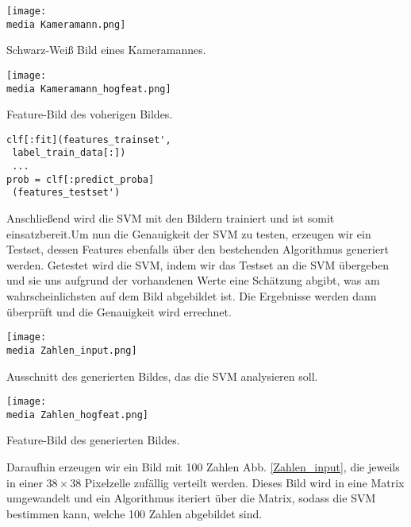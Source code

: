 \begin{dsafigure}
\begin{center}
	\texttt{[image: \\media Kameramann.png]}
	\caption{Schwarz-Weiß Bild eines Kameramannes.}
	\label{Kameramann}
\end{center}
\end{dsafigure}

\begin{dsafigure}
\begin{center}
	\texttt{[image: \\media Kameramann\_hogfeat.png]}
	\caption{Feature-Bild des voherigen Bildes.}
	\label{Kameramann_hogfeat}
\end{center}
\end{dsafigure}

\begin{verbatim}
clf[:fit](features_trainset', 
 label_train_data[:])
 ...
prob = clf[:predict_proba]
 (features_testset')
\end{verbatim}

Anschließend wird die SVM mit den Bildern trainiert und ist somit einsatzbereit.Um nun die Genauigkeit der SVM zu testen, erzeugen wir ein Testset, dessen Features ebenfalls über den bestehenden Algorithmus generiert werden. Getestet wird die SVM, indem wir das Testset an die SVM übergeben und sie uns aufgrund der vorhandenen Werte eine Schätzung abgibt, was am wahrscheinlichsten auf dem Bild abgebildet ist. Die Ergebnisse werden dann überprüft und die Genauigkeit wird errechnet.

\begin{dsafigure}
\begin{center}
	\texttt{[image: \\media Zahlen\_input.png]}
	\caption{Ausschnitt des generierten Bildes, das die SVM analysieren soll.}
	\label{Zahlen_input}
\end{center}
\end{dsafigure}

\begin{dsafigure}
\begin{center}
	\texttt{[image: \\media Zahlen\_hogfeat.png]}
	\caption{Feature-Bild des generierten Bildes.}
	\label{Zahlen_hogfeat}
\end{center}
\end{dsafigure}

Daraufhin erzeugen wir ein Bild mit 100 Zahlen Abb. \ref{Zahlen_input}, die jeweils in einer $38 \times 38$ Pixelzelle zufällig verteilt werden. Dieses Bild wird in eine Matrix umgewandelt und ein Algorithmus iteriert über die Matrix, sodass die SVM bestimmen kann, welche 100 Zahlen abgebildet sind.


